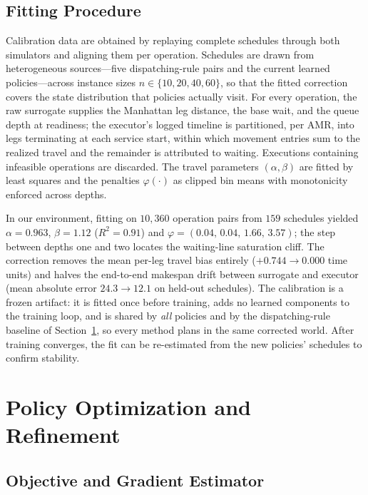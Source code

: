 \subsection{Fitting Procedure}

Calibration data are obtained by replaying complete schedules through
both simulators and aligning them per operation. Schedules are drawn
from heterogeneous sources---five dispatching-rule pairs and the
current learned policies---across instance sizes
$n\in\{10,20,40,60\}$, so that the fitted correction covers the state
distribution that policies actually visit. For every operation, the
raw surrogate supplies the Manhattan leg distance, the base wait, and
the queue depth at readiness; the executor's logged timeline is
partitioned, per AMR, into legs terminating at each service start,
within which movement entries sum to the realized travel and the
remainder is attributed to waiting. Executions containing infeasible
operations are discarded. The travel parameters $(\alpha,\beta)$ are
fitted by least squares and the penalties $\varphi(\cdot)$ as clipped
bin means with monotonicity enforced across depths.

In our environment, fitting on $10{,}360$ operation pairs from $159$
schedules yielded $\alpha=0.963$, $\beta=1.12$ ($R^{2}=0.91$) and
$\varphi=(0.04,\,0.04,\,1.66,\,3.57)$; the step between depths one and
two locates the waiting-line saturation cliff. The correction removes
the mean per-leg travel bias entirely ($+0.744\to0.000$ time units)
and halves the end-to-end makespan drift between surrogate and
executor (mean absolute error $24.3\to12.1$ on held-out schedules).
The calibration is a frozen artifact: it is fitted once before
training, adds no learned components to the training loop, and is
shared by \emph{all} policies and by the dispatching-rule baseline of
Section~\ref{sec:training}, so every method plans in the same
corrected world. After training converges, the fit can be re-estimated
from the new policies' schedules to confirm stability.


\section{Policy Optimization and Refinement}
\label{sec:training}

\subsection{Objective and Gradient Estimator}

